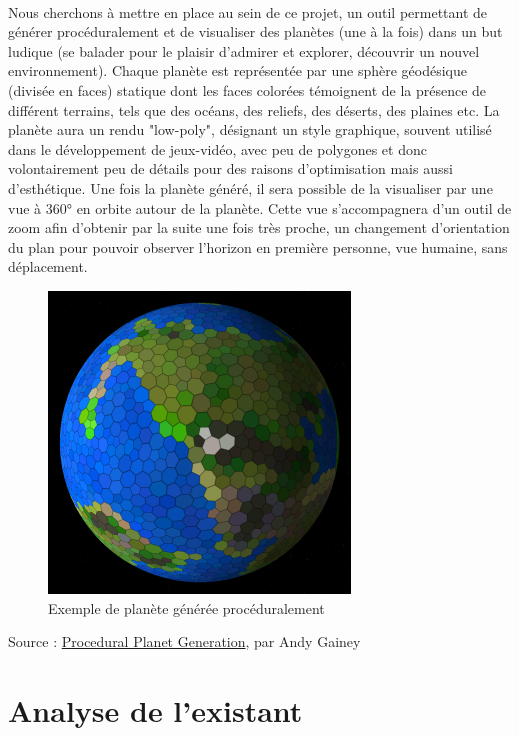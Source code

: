 \documentclass[a4paper]{article}
\begin{document}
\paragraph{}
Nous cherchons à mettre en place au sein de ce projet, un outil permettant de générer procéduralement et de visualiser des planètes (une à la fois) dans un but ludique (se balader pour le plaisir d'admirer et explorer, découvrir un nouvel environnement). Chaque planète est représentée par une sphère géodésique (divisée en faces) statique dont les faces colorées témoignent de la présence de différent terrains, tels que des océans, des reliefs, des déserts, des plaines etc. La planète aura un rendu "low-poly", désignant un style graphique, souvent utilisé dans le développement de jeux-vidéo, avec peu de polygones et donc volontairement peu de détails pour des raisons d'optimisation mais aussi d'esthétique. Une fois la planète généré, il sera possible de la visualiser par une vue à 360° en orbite autour de la planète. Cette vue s'accompagnera d'un outil de zoom afin d'obtenir par la suite une fois très proche, un changement d'orientation du plan pour pouvoir observer l'horizon en première personne, vue humaine, sans déplacement.

\begin{figure}[!h]
\begin{center} \includegraphics{img/planete.png} \end{center}
\caption{Exemple de planète générée procéduralement}

\end{figure}

Source : \href{https://experilous.com/1/blog/post/procedural-planet-generation}{Procedural Planet Generation}, par Andy Gainey

\newpage
\section{Analyse de l'existant}
\end{document}
